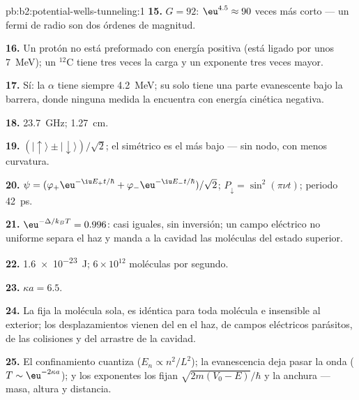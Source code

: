 \begin{solution}{pb:b2:potential-wells-tunneling:1}
\textbf{15.} $G = 92$: $\eu^{4.5} \approx 90$ veces más corto --- un fermi de radio
son dos órdenes de magnitud.

\textbf{16.} Un protón no está preformado con energía positiva (está
ligado por unos \qty{7}{MeV}); un $^{12}$C tiene tres veces la carga y un
exponente tres veces mayor.

\textbf{17.} Sí: la $\alpha$ tiene siempre \qty{4.2}{MeV}; su 
solo tiene una parte evanescente bajo la barrera, donde ninguna medida
la encuentra con energía cinética negativa.

\textbf{18.} \qty{23.7}{GHz}; \qty{1.27}{cm}.

\textbf{19.} $(|{\uparrow}\rangle \pm |{\downarrow}\rangle)/\sqrt2$; el
simétrico es el más bajo --- sin nodo, con menos curvatura.

\textbf{20.} $\psi = (\varphi_+\eu^{-\iu E_+t/\hbar} + \varphi_-\eu^{-\iu E_-t/\hbar})/\sqrt2$;
$P_{\downarrow} = \sin^2(\pi\nu t)$; periodo \qty{42}{ps}.

\textbf{21.} $\eu^{-\Delta/k_BT} = 0.996$: casi iguales, sin inversión; un
campo eléctrico no uniforme separa el haz y manda a la cavidad las moléculas
del estado superior.

\textbf{22.} \qty{1.6e-23}{J}; $6 \times 10^{12}$ moléculas por segundo.

\textbf{23.} $\kappa a = 6.5$.

\textbf{24.} La fija la molécula sola, es idéntica para toda
molécula e insensible al exterior; los desplazamientos vienen del
 en el haz, de campos eléctricos parásitos, de las colisiones y
del arrastre de la cavidad.

\textbf{25.} El confinamiento cuantiza ($E_n \propto n^2/L^2$); la evanescencia deja
pasar la onda ($T \sim \eu^{-2\kappa a}$); y los exponentes los fijan
$\sqrt{2m(V_0 - E)}/\hbar$ y la anchura --- masa, altura y distancia.
\end{solution}
